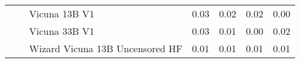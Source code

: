 \begin{table}[!htbp]
\begin{tabular}{l|l|l|rrrr}
 &  & Vicuna 13B V1 & {\cellcolor[HTML]{E2EDF5}} \color[HTML]{000000} 0.03 & {\cellcolor[HTML]{E5EFF6}} \color[HTML]{000000} 0.02 & {\cellcolor[HTML]{ECF4F9}} \color[HTML]{000000} 0.02 & {\cellcolor[HTML]{F6FBFC}} \color[HTML]{000000} 0.00 \\
 &  & Vicuna 33B V1 & {\cellcolor[HTML]{DCE9F2}} \color[HTML]{000000} 0.03 & {\cellcolor[HTML]{EEF5F9}} \color[HTML]{000000} 0.01 & {\cellcolor[HTML]{F5FAFC}} \color[HTML]{000000} 0.00 & {\cellcolor[HTML]{ECF4F9}} \color[HTML]{000000} 0.02 \\
 &  & Wizard Vicuna 13B Uncensored HF & {\cellcolor[HTML]{EEF6FA}} \color[HTML]{000000} 0.01 & {\cellcolor[HTML]{EDF5F9}} \color[HTML]{000000} 0.01 & {\cellcolor[HTML]{F2F8FB}} \color[HTML]{000000} 0.01 & {\cellcolor[HTML]{F3F9FB}} \color[HTML]{000000} 0.01 \\
\bottomrule
\end{tabular}
            
\end{table}
